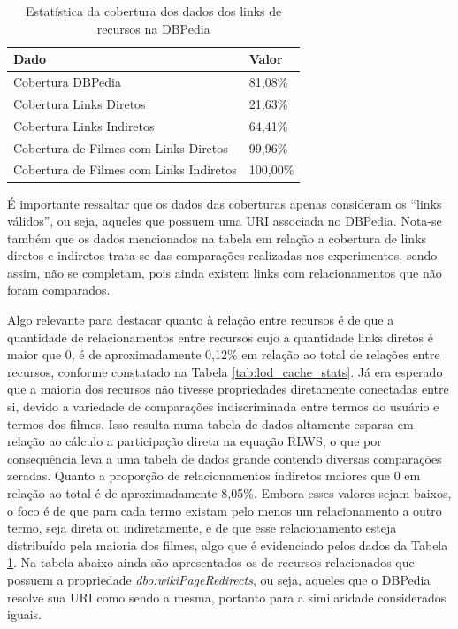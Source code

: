 \begin{table}[H]
\centering
\begin{tabular}{|l|l|}
\hline
\textbf{Dado}                           & \textbf{Valor} \\ \hline
Cobertura DBPedia                       & 81,08\%        \\ \hline
Cobertura Links Diretos                 & 21,63\%        \\ \hline
Cobertura Links Indiretos               & 64,41\%        \\ \hline
Cobertura de Filmes com Links Diretos   & 99,96\%        \\ \hline
Cobertura de Filmes com Links Indiretos & 100,00\%       \\ \hline
\end{tabular}
\caption{Estatística da cobertura dos dados dos links de recursos na DBPedia}
\label{tab:lod_statistics}
\end{table}

É importante ressaltar que os dados das coberturas apenas consideram os \enquote{links válidos}, ou seja, aqueles que possuem uma URI associada no DBPedia. Nota-se também que os dados mencionados na tabela em relação a cobertura de links diretos e indiretos trata-se das comparações realizadas nos experimentos, sendo assim, não se completam, pois ainda existem links com relacionamentos que não foram comparados.

Algo relevante para destacar quanto à relação entre recursos é de que a quantidade de relacionamentos entre recursos cujo a quantidade links diretos é maior que 0, é de aproximadamente 0,12\% em relação ao total de relações entre recursos, conforme constatado na Tabela \ref{tab:lod_cache_stats}. Já era esperado que a maioria dos recursos não tivesse propriedades diretamente conectadas entre si, devido a variedade de comparações indiscriminada entre termos do usuário e termos dos filmes. Isso resulta numa tabela de dados altamente esparsa em relação ao cálculo a participação direta na equação \ac{RLWS}, o que por consequência leva a uma tabela de dados grande contendo diversas comparações zeradas. Quanto a proporção de relacionamentos indiretos maiores que 0 em relação ao total é de aproximadamente 8,05\%. Embora esses valores sejam baixos, o foco é de que para cada termo existam pelo menos um relacionamento a outro termo, seja direta ou indiretamente, e de que esse relacionamento esteja distribuído pela maioria dos filmes, algo que é evidenciado pelos dados da Tabela \ref{tab:lod_statistics}. Na tabela abaixo ainda são apresentados os de recursos relacionados que possuem a propriedade \textit{dbo:wikiPageRedirects}, ou seja, aqueles que o DBPedia resolve sua \ac{URI} como sendo a mesma, portanto para a similaridade considerados iguais.

